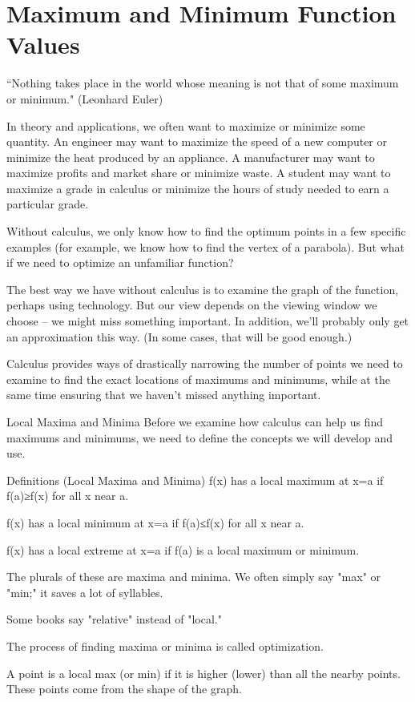 \section{Maximum and Minimum Function Values}
\label{sec:optimization}

``Nothing takes place in the world whose meaning is not that of some maximum or minimum." (Leonhard Euler)

In theory and applications, we often want to maximize or minimize some quantity. An engineer may want to maximize the speed of a new computer or minimize the heat produced by an appliance. A manufacturer may want to maximize profits and market share or minimize waste. A student may want to maximize a grade in calculus or minimize the hours of study needed to earn a particular grade.

Without calculus, we only know how to find the optimum points in a few specific examples (for example, we know how to find the vertex of a parabola). But what if we need to optimize an unfamiliar function?

The best way we have without calculus is to examine the graph of the function, perhaps using technology. But our view depends on the viewing window we choose – we might miss something important. In addition, we’ll probably only get an approximation this way. (In some cases, that will be good enough.)

Calculus provides ways of drastically narrowing the number of points we need to examine to find the exact locations of maximums and minimums, while at the same time ensuring that we haven’t missed anything important.

Local Maxima and Minima
Before we examine how calculus can help us find maximums and minimums, we need to define the concepts we will develop and use.

Definitions (Local Maxima and Minima)
f(x) has a local maximum at x=a if f(a)≥f(x) for all x near a.

f(x) has a local minimum at x=a if f(a)≤f(x) for all x near a.

f(x) has a local extreme at x=a if f(a) is a local maximum or minimum.

The plurals of these are maxima and minima. We often simply say "max" or "min;" it saves a lot of syllables.

Some books say "relative" instead of "local."

The process of finding maxima or minima is called optimization.

A point is a local max (or min) if it is higher (lower) than all the nearby points. These points come from the shape of the graph.

